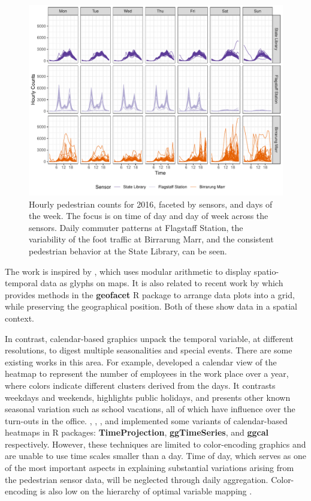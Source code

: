 \documentclass[12pt]{article}
\begin{document}
\begin{figure}

{\centering \includegraphics[width=\textwidth]{figure/facet-time-1} 

}

\caption{Hourly pedestrian counts for 2016, faceted by sensors, and days of the week. The focus is on time of day and day of week across the sensors. Daily commuter patterns at Flagstaff Station, the variability of the foot traffic at Birrarung Marr, and the consistent pedestrian behavior at the State Library, can be seen.}\label{fig:facet-time}
\end{figure}



The work is inspired by \citet{Wickham2012glyph}, which uses modular arithmetic to display spatio-temporal data as glyphs on maps. It is also related to recent work by \citet{R-geofacet} which provides methods in the \textbf{geofacet} R package to arrange data plots into a grid, while preserving the geographical position. Both of these show data in a spatial context.

In contrast, calendar-based graphics unpack the temporal variable, at different resolutions, to digest multiple seasonalities and special events. There are some existing works in this area. For example, \citet{VanWijkCluster1999} developed a calendar view of the heatmap to represent the number of employees in the work place over a year, where colors indicate different clusters derived from the days. It contrasts weekdays and weekends, highlights public holidays, and presents other known seasonal variation such as school vacations, all of which have influence over the turn-outs in the office. \citet{Jones-heatmap}, \citet{R-TimeProjection}, \citet{R-ggTimeSeries}, and \citet{R-ggcal} implemented some variants of calendar-based heatmaps in R packages: \textbf{TimeProjection}, \textbf{ggTimeSeries}, and \textbf{ggcal} respectively. However, these techniques are limited to color-encoding graphics and are unable to use time scales smaller than a day. Time of day, which serves as one of the most important aspects in explaining substantial variations arising from the pedestrian sensor data, will be neglected through daily aggregation. Color-encoding is also low on the hierarchy of optimal variable mapping \citep{cleveland1984graphical, lam2007overview}.
\end{document}
